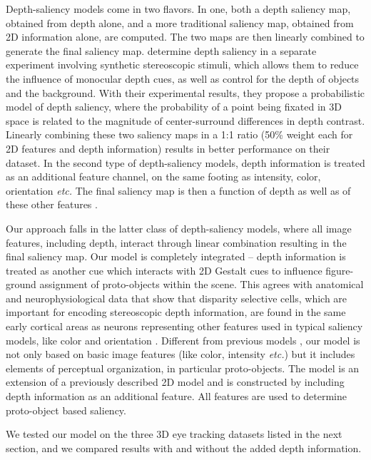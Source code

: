\documentclass[12pt]{article}
\newcommand{\etc}[0]{{\em etc.}\xspace}
\begin{document}
Depth-saliency models come in two flavors. In one, both a depth
saliency map, obtained from depth alone, and a more traditional
saliency map, obtained from 2D information alone, are computed. The two
maps are then linearly combined to generate the final saliency
map. \cite{Wang_etal13} determine depth saliency in a separate
experiment involving synthetic stereoscopic stimuli, which allows them
to reduce the influence of monocular depth cues, as well as control
for the depth of objects and the background. With their experimental
results, they propose a probabilistic model of depth saliency, where
the probability of a point being fixated in 3D space is related to the
magnitude of center-surround differences in depth contrast. Linearly
combining these two saliency maps in a 1:1 ratio (50\% weight each for
2D features and depth information) results in better performance on
their dataset. In the second type of depth-saliency models, depth
information is treated as an additional feature channel, on the same
footing as intensity, color, orientation \etc The final saliency map is then a function of depth as well as of these other features
\citep{Ouerhani_etal00,Jost_etal04,Hugli_etal05}.

Our approach falls in the latter class of depth-saliency models, where
all image features, including depth, interact through linear
combination resulting in the final saliency map. Our model is
completely integrated -- depth information is treated as another cue
which interacts with 2D Gestalt cues to influence figure-ground
assignment of proto-objects within the scene. This agrees with
anatomical and neurophysiological data that show that disparity
selective cells, which are important for encoding stereoscopic depth
information, are found in the same early cortical areas as neurons
representing other features used in typical saliency models, like
color and orientation \citep{Hubel_Wiesel62,Poggio_etal88b}. Different
from previous models \citep{Ouerhani_etal00,Jost_etal04,Hugli_etal05},
our model is not only based on basic image features (like color,
intensity \etc) but it includes elements of perceptual organization,
in particular proto-objects. The model is an extension of a previously
described 2D model \citep{Russell_etal14} and is constructed by including
depth information as an additional feature. All features are used to
determine proto-object based saliency.

We tested our model on the three 3D eye tracking datasets listed in
the next section, and we compared results with and without the added
depth information.
\end{document}
